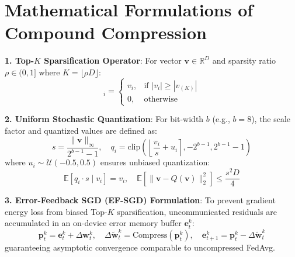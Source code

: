 \documentclass[11pt,a4paper,titlepage]{report}
\begin{document}
\section{Mathematical Formulations of Compound Compression}
\begin{mathfoundation}
\textbf{1. Top-$K$ Sparsification Operator}:
For vector $\mathbf{v} \in \mathbb{R}^D$ and sparsity ratio $\rho \in (0, 1]$ where $K = \lfloor \rho D \rfloor$:
\begin{equation}
    [\text{Top}_K(\mathbf{v})]_i = \begin{cases}
        v_i, & \text{if } |v_i| \ge |v_{(K)}| \\
        0, & \text{otherwise}
    \end{cases}
\end{equation}

\textbf{2. Uniform Stochastic Quantization}:
For bit-width $b$ (e.g., $b=8$), the scale factor and quantized values are defined as:
\begin{equation}
    s = \frac{\|\mathbf{v}\|_\infty}{2^{b-1} - 1}, \quad q_i = \text{clip}\left( \left\lfloor \frac{v_i}{s} + u_i \right\rceil, -2^{b-1}, 2^{b-1} - 1 \right)
\end{equation}
where $u_i \sim \mathcal{U}(-0.5, 0.5)$ ensures unbiased quantization:
\begin{equation}
    \mathbb{E}[q_i \cdot s \mid v_i] = v_i, \quad \mathbb{E}[\|\mathbf{v} - Q(\mathbf{v})\|_2^2] \le \frac{s^2 D}{4}
\end{equation}

\textbf{3. Error-Feedback SGD (EF-SGD) Formulation}:
To prevent gradient energy loss from biased Top-$K$ sparsification, uncommunicated residuals are accumulated in an on-device error memory buffer $\mathbf{e}_t^k$:
\begin{equation}
    \mathbf{p}_t^k = \mathbf{e}_t^k + \Delta\mathbf{w}_t^k, \quad \Delta\tilde{\mathbf{w}}_t^k = \text{Compress}(\mathbf{p}_t^k), \quad \mathbf{e}_{t+1}^k = \mathbf{p}_t^k - \Delta\tilde{\mathbf{w}}_t^k
\end{equation}
guaranteeing asymptotic convergence comparable to uncompressed FedAvg.
\end{mathfoundation}
\end{document}
